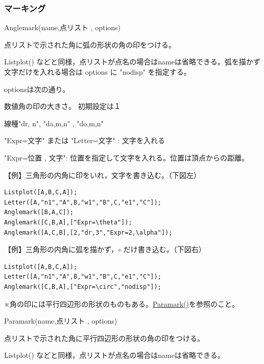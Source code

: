 \documentclass[papersize,a4paper,12pt,uplatex]{jsarticle}
\begin{document}
\subsubsection{マーキング}
\begin{description}

\hypertarget{anglemark}{}
\item[関数]Anglemark(name,点リスト , options)
\item[機能]点リストで示された角に弧の形状の角の印をつける。
\item[説明]Listplot() などと同様，点リストが点名の場合はnameは省略できる。弧を描かず文字だけを入れる場合は options に "nodisp" を指定する。

optionsは次の通り。

数値角の印の大きさ。 初期設定は１

線種"dr, n", "da,m,n" , "do,m,n"

"Expr=文字" または "Letter=文字" : 文字を入れる

"Expr=位置 , 文字": 位置を指定して文字を入れる。位置は頂点からの距離。

\vspace{\baselineskip}
【例】三角形の内角に印をいれ，文字を書き込む。（下図左）
\begin{verbatim}
Listplot([A,B,C,A]);
Letter([A,"n1","A",B,"w1","B",C,"e1","C"]);
Anglemark([B,A,C]);
Anglemark([C,B,A],["Expr=\theta"]);
Anglemark([A,C,B],[2,"dr,3","Expr=2,\alpha"]);
\end{verbatim}

【例】三角形の内角に弧を描かず，$\circ$ だけ書き込む。（下図右）
\begin{verbatim}
Listplot([A,B,C,A]);
Letter([A,"n1","A",B,"w1","B",C,"e1","C"]);
Anglemark([C,B,A],["Expr=\circ","nodisp"]);
\end{verbatim}


\hspace{5mm}

※角の印には平行四辺形の形状のものもある。\hyperlink{paramark}{Paramark()}を参照のこと。

\vspace{\baselineskip}
\hypertarget{paramark}{}
\item[関数]Paramark(name,点リスト , options)
\item[機能]点リストで示された角に平行四辺形の形状の角の印をつける。
\item[説明]Listplot() などと同様，点リストが点名の場合はnameは省略できる。


\end{description}
\end{document}
